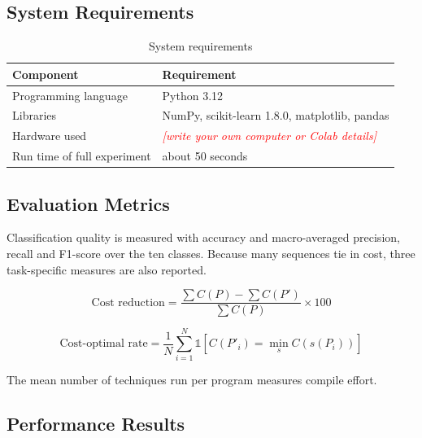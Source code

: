 \documentclass[12pt,a4paper]{article}
\newcommand{\todo}[1]{\textcolor{red}{\textit{[#1]}}}
\begin{document}
\subsection{System Requirements}

\begin{table}[H]
\centering
\caption{System requirements}
\begin{tabular}{ll}
\toprule
\textbf{Component} & \textbf{Requirement}\\
\midrule
Programming language & Python 3.12\\
Libraries & NumPy, scikit-learn 1.8.0, matplotlib, pandas\\
Hardware used & \todo{write your own computer or Colab details}\\
Run time of full experiment & about 50 seconds\\
\bottomrule
\end{tabular}
\end{table}

\subsection{Evaluation Metrics}

Classification quality is measured with accuracy and macro-averaged precision,
recall and F1-score over the ten classes. Because many sequences tie in cost,
three task-specific measures are also reported.

\begin{equation}
\text{Cost reduction} = \frac{\sum C(P) - \sum C(P')}{\sum C(P)} \times 100
\end{equation}

\begin{equation}
\text{Cost-optimal rate} = \frac{1}{N}\sum_{i=1}^{N}
\mathbb{1}\left[C(P'_i) = \min_s C(s(P_i))\right]
\end{equation}

The mean number of techniques run per program measures compile effort.

\subsection{Performance Results}
\end{document}
